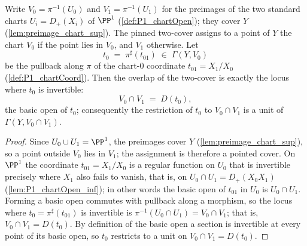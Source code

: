 \begin{definition}
  \label{def:fiberCover}
  \leanok
  Write \(V_0 = \pi^{-1}(U_0)\) and \(V_1 = \pi^{-1}(U_1)\) for the preimages of the two standard
  charts \(U_i = D_+(X_i)\) of \(\PP^1\) (\ref{def:P1_chartOpen}); they cover \(Y\)
  (\ref{lem:preimage_chart_sup}). The pinned two-cover assigns to a point of \(Y\) the chart \(V_0\)
  if the point lies in \(V_0\), and \(V_1\) otherwise. Let
  \[
    t_0 \;=\; \pi^{\sharp}(t_{01}) \;\in\; \Gamma(Y, V_0)
  \]
  be the pullback along \(\pi\) of the chart-\(0\) coordinate \(t_{01} = X_1/X_0\)
  (\ref{def:P1_chartCoord}). Then the overlap of the two-cover is exactly the locus where \(t_0\) is
  invertible:
  \[
    V_0 \cap V_1 \;=\; D(t_0),
  \]
  the basic open of \(t_0\); consequently the restriction of \(t_0\) to \(V_0 \cap V_1\) is a unit of
  \(\Gamma(Y, V_0 \cap V_1)\).
\end{definition}
\begin{proof}
  \leanok
  Since \(U_0 \cup U_1 = \PP^1\), the preimages cover \(Y\) (\ref{lem:preimage_chart_sup}), so a
  point outside \(V_0\) lies in \(V_1\); the assignment is therefore a pointed cover. On \(\PP^1\)
  the coordinate \(t_{01} = X_1/X_0\) is a regular function on \(U_0\) that is invertible precisely
  where \(X_1\) also fails to vanish, that is, on \(U_0 \cap U_1 = D_+(X_0 X_1)\)
  (\ref{lem:P1_chartOpen_inf}); in other words the basic open of \(t_{01}\) in \(U_0\) is
  \(U_0 \cap U_1\). Forming a basic open commutes with pullback along a morphism, so the locus where
  \(t_0 = \pi^{\sharp}(t_{01})\) is invertible is \(\pi^{-1}(U_0 \cap U_1) = V_0 \cap V_1\); that is,
  \(V_0 \cap V_1 = D(t_0)\). By definition of the basic open a section is invertible at every point
  of its basic open, so \(t_0\) restricts to a unit on \(V_0 \cap V_1 = D(t_0)\).
\end{proof}


